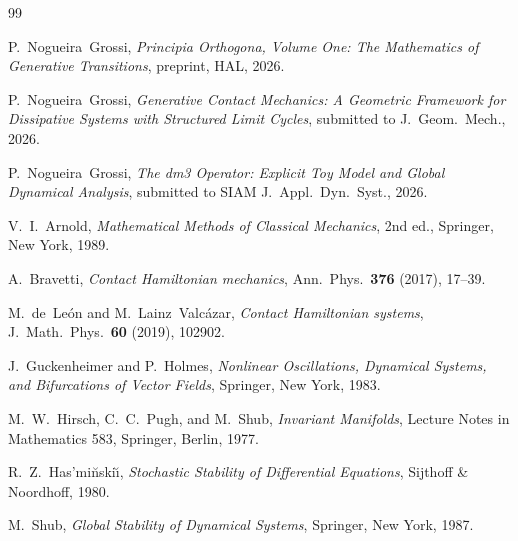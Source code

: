 \documentclass[12pt]{article}
\numberwithin{equation}{section}
\theoremstyle{remark}
\begin{document}
\begin{thebibliography}{99}

P.~Nogueira~Grossi,
\emph{Principia Orthogona, Volume One: The Mathematics of
  Generative Transitions},
preprint, HAL, 2026.

P.~Nogueira~Grossi,
\emph{Generative Contact Mechanics: A Geometric Framework for
  Dissipative Systems with Structured Limit Cycles},
submitted to J.\ Geom.\ Mech., 2026.

P.~Nogueira~Grossi,
\emph{The dm3 Operator: Explicit Toy Model and Global Dynamical
  Analysis},
submitted to SIAM J.\ Appl.\ Dyn.\ Syst., 2026.

V.~I.~Arnold,
\emph{Mathematical Methods of Classical Mechanics},
2nd ed., Springer, New York, 1989.

A.~Bravetti,
\emph{Contact Hamiltonian mechanics},
Ann.\ Phys.\ \textbf{376} (2017), 17--39.

M.~de~Le{\'o}n and M.~Lainz~Valc{\'a}zar,
\emph{Contact Hamiltonian systems},
J.\ Math.\ Phys.\ \textbf{60} (2019), 102902.

J.~Guckenheimer and P.~Holmes,
\emph{Nonlinear Oscillations, Dynamical Systems, and Bifurcations
  of Vector Fields},
Springer, New York, 1983.

M.~W.~Hirsch, C.~C.~Pugh, and M.~Shub,
\emph{Invariant Manifolds},
Lecture Notes in Mathematics 583, Springer, Berlin, 1977.

R.~Z.~Has{'}mi{\u{n}}ski{\u{\i}},
\emph{Stochastic Stability of Differential Equations},
Sijthoff \& Noordhoff, 1980.

M.~Shub,
\emph{Global Stability of Dynamical Systems},
Springer, New York, 1987.

\end{thebibliography}
\end{document}
